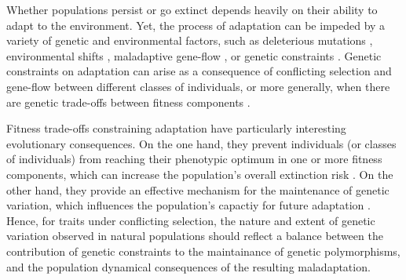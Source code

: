 \documentclass[11pt]{article}
\begin{document}
 Whether populations persist or go extinct depends heavily on their ability to adapt to the environment. Yet, the process of adaptation can be impeded by a variety of genetic and environmental factors, such as deleterious mutations \citep{Haldane1957}, environmental shifts \citep{Maynard-Smith1976, LandeShannon1996,OrrUnckless2008}, maladaptive gene-flow \citep{KirkpatrickBarton1997, BolnickNosil2007}, or genetic constraints \citep{ConnallonHall2018}. Genetic constraints on adaptation can arise as a consequence of conflicting selection and gene-flow between different classes of individuals, or more generally, when there are genetic trade-offs between fitness components \citep{CharlesworthHughes2000, ConnallonHall2018}. 



Fitness trade-offs constraining adaptation have particularly interesting evolutionary consequences. On the one hand, they prevent individuals (or classes of individuals) from reaching their phenotypic optimum in one or more fitness components, which can increase the population's overall extinction risk \citep{holman2013consequences, harts2014demography}. On the other hand, they provide an effective mechanism for the maintenance of genetic variation, which influences the population's capactiy for future adaptation \citep{Fisher1930, CharlesworthHughes2000, ConnallonHall2018, MatthewsConnallon2019}. Hence, for traits under conflicting selection, the nature and extent of genetic variation observed in natural populations should reflect a balance between the contribution of genetic constraints to the maintainance of genetic polymorphisms, and the population dynamical consequences of the resulting maladaptation.
\end{document}
